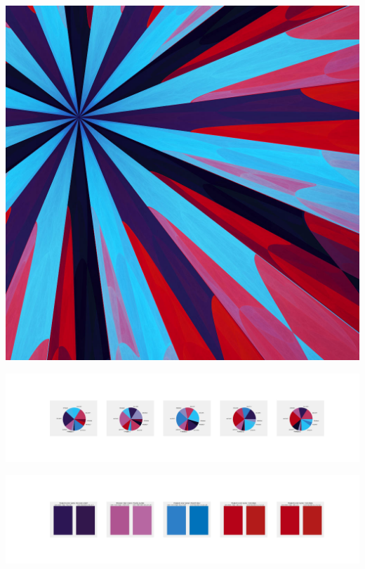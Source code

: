 \documentclass[11pt]{article}
\begin{document}
\begin{landscape}
    \begin{center}
    \includegraphics[width=\textwidth]{./nbimg/file (180).jpg}
    \end{center}

    \begin{center}
    \includegraphics[width=250mm]{./nbimg/pie-90.jpg}
    \end{center}

    \begin{center}
    \includegraphics[width=250mm]{./nbimg/peak-90.jpg}
    \end{center}
    


\end{landscape}
\end{document}
